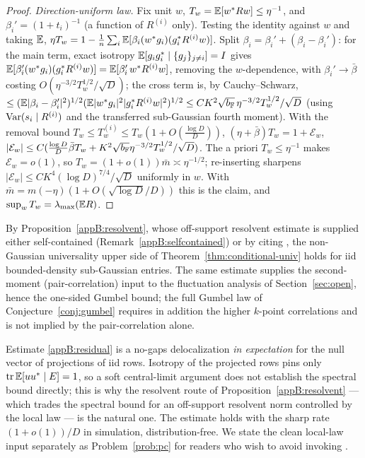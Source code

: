 \begin{proof}
\emph{Direction-uniform law.}  Fix unit $w$, $T_w=\mathbb{E}[w^*Rw]\le\eta^{-1}$, and $\beta_i'=(1+t_i)^{-1}$
(a function of $R^{(i)}$ only).  Testing the identity against $w$ and taking $\mathbb{E}$,
$\eta T_w=1-\tfrac1n\sum_i\mathbb{E}[\beta_i(w^*g_i)(g_i^*R^{(i)}w)]$.  Split $\beta_i=\beta_i'+(\beta_i-\beta_i')$:
for the main term, exact isotropy $\mathbb{E}[g_ig_i^*\mid\{g_j\}_{j\ne i}]=I$ gives
$\mathbb{E}[\beta_i'(w^*g_i)(g_i^*R^{(i)}w)]=\mathbb{E}[\beta_i'\,w^*R^{(i)}w]$, removing the $w$-dependence, with
$\beta_i'\to\bar\beta$ costing $O(\eta^{-3/2}T_w^{1/2}/\sqrt D)$; the cross term is, by
Cauchy--Schwarz, $\le(\mathbb{E}|\beta_i-\beta_i'|^2)^{1/2}(\mathbb{E}|w^*g_i|^2|g_i^*R^{(i)}w|^2)^{1/2}
\le CK^2\sqrt{b_{\mathbb{F}}}\,\eta^{-3/2}T_w^{1/2}/\sqrt D$ (using $\operatorname{Var}(s_i\mid R^{(i)})$ and the transferred
sub-Gaussian fourth moment).  With the removal bound $T_w\le T_w^{(i)}\le T_w(1+O(\tfrac{\log D}{D}))$,
$(\eta+\bar\beta)T_w=1+\mathcal E_w$, $|\mathcal E_w|\le C(\tfrac{\log D}{D}\bar\beta T_w
+K^2\sqrt{b_{\mathbb{F}}}\eta^{-3/2}T_w^{1/2}/\sqrt D)$.  The a priori $T_w\le\eta^{-1}$ makes $\mathcal E_w=o(1)$,
so $T_w=(1+o(1))\bar m\asymp\eta^{-1/2}$; re-inserting sharpens
$|\mathcal E_w|\le CK^4(\log D)^{7/4}/\sqrt D$ uniformly in $w$.  With
$\bar m=m(-\eta)(1+O(\sqrt{\log D}/D))$ this is the claim, and $\sup_w T_w=\lambda_{\max}(\mathbb{E} R)$.
\end{proof}

\begin{corollary}\label{appB:closure}
By Proposition~\ref{appB:resolvent}, whose off-support resolvent estimate is supplied either
self-contained (Remark~\ref{appB:selfcontained}) or by citing \cite{BEKYY2014,KnowlesYin2017}, the
non-Gaussian universality upper side of
Theorem~\ref{thm:conditional-univ} holds for iid bounded-density sub-Gaussian entries.  The same estimate
supplies the second-moment (pair-correlation) input to the fluctuation analysis of
Section~\ref{sec:open}, hence the one-sided Gumbel bound; the full Gumbel law of
Conjecture~\ref{conj:gumbel} requires in addition the higher $k$-point correlations and is not implied by
the pair-correlation alone.
\end{corollary}

\begin{remark}
Estimate \eqref{appB:residual} is a no-gaps delocalization \emph{in expectation} for the null
vector of projections of iid rows.  Isotropy of the projected rows pins only $\operatorname{tr}\mathbb{E}[uu^*\mid E]=1$,
so a soft central-limit argument does not establish the spectral bound directly; this is why the
resolvent route of Proposition~\ref{appB:resolvent} --- which trades the spectral bound for an
off-support resolvent norm controlled by the local law --- is the natural one.  The estimate holds
with the sharp rate $(1+o(1))/D$ in simulation, distribution-free.  We state the clean local-law
input separately as Problem~\ref{prob:pc} for readers who wish to avoid invoking
\cite{BEKYY2014,KnowlesYin2017}.
\end{remark}
